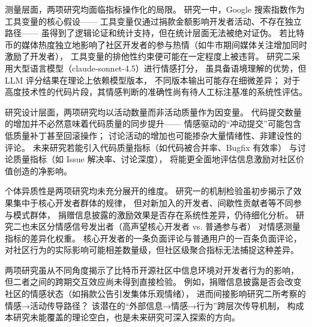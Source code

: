 测量层面，两项研究均面临指标操作化的局限。
研究一中，Google 搜索指数作为工具变量的核心假设——
工具变量仅通过捐款金额影响开发者活动、不存在独立路径——
虽得到了逻辑论证和统计支持，但在统计层面无法被绝对证伪。
若比特币的媒体热度独立地影响了社区开发者的参与热情（如牛市期间媒体关注增加同时激励了开发者），
工具变量的排他性约束便可能在一定程度上被违背。
研究二采用大型语言模型（claude-sonnet-4.5）进行情感打分，
虽具备语境理解的优势，但 LLM 评分结果在理论上依赖模型版本，
不同版本输出可能存在细微差异；
对于高度技术性的代码片段，其情感判断的准确性尚有待人工标注基准的系统性评估。

研究设计层面，两项研究均以活动数量而非活动质量作为因变量。
代码提交数量的增加并不必然意味着代码质量的同步提升——
情感驱动的“冲动提交”可能包含低质量补丁甚至回滚操作；
讨论活动的增加也可能掺杂大量情绪性、非建设性的评论。
未来研究若能引入代码质量指标（如代码被合并率、Bugfix 有效率）
与讨论质量指标（如 Issue 解决率、讨论深度），
将能更全面地评估信息激励对社区价值创造的净影响。

个体异质性是两项研究均未充分展开的维度。
研究一的机制检验虽初步揭示了效果集中于核心开发者群体的规律，
但对新加入的开发者、间歇性贡献者等不同参与模式群体，
捐赠信息披露的激励效果是否存在系统性差异，仍待细化分析。
研究二也未区分情感信号发出者（高声望核心开发者 vs. 普通参与者）
对情感测量指标的差异化权重。
核心开发者的一条负面评论与普通用户的一百条负面评论，
对社区行为的实际影响可能相差数量级，但社区级聚合指标无法捕捉这种差异。

两项研究虽从不同角度揭示了比特币开源社区中信息环境对开发者行为的影响，
但二者之间的跨期交互效应尚未得到直接检验。
例如，捐赠信息披露是否会改变社区的情感状态（如捐款公告引发集体乐观情绪），
进而间接影响研究二所考察的情感→活动传导路径？
该潜在的“外部信息→情感→行为”跨层次传导机制，
构成本研究未能覆盖的理论空白，也是未来研究可深入探索的方向。



